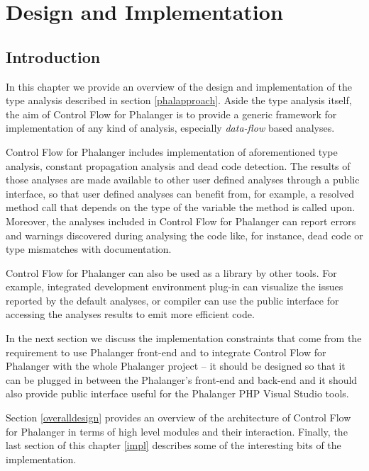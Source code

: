 \chapter{Design and Implementation}
\label{designandimpl}

    \section{Introduction}
    
    In this chapter we provide an overview of the design and 
    implementation of the type analysis described in 
    section \ref{phalapproach}. Aside the type analysis 
    itself, the aim of Control Flow for Phalanger is to provide 
    a generic framework for implementation of any kind 
    of analysis, especially \emph{data-flow} based analyses.
    
    Control Flow for Phalanger includes implementation of 
    aforementioned type analysis, constant propagation analysis 
    and dead code detection. The results of those analyses 
    are made available to other user defined analyses 
    through a public interface, so that user defined analyses 
    can benefit from, for example, a resolved method call 
    that depends on the type of the variable the method 
    is called upon. Moreover, the analyses included in 
    Control Flow for Phalanger can report errors and warnings 
    discovered during analysing the code like, for instance, 
    dead code or type mismatches with documentation.
    
    Control Flow for Phalanger can also be used as a 
    library by other tools. For example, integrated 
    development environment plug-in can visualize the 
    issues reported by the default analyses, or compiler 
    can use the public interface for accessing the 
    analyses results to emit more efficient code.
    
    In the next section we discuss the implementation 
    constraints that come from the requirement to use 
    Phalanger front-end and to integrate Control Flow 
    for Phalanger with the whole Phalanger project -- 
    it should be designed so that it can be plugged 
    in between the Phalanger's front-end and back-end 
    and it should also provide public interface useful 
    for the Phalanger PHP Visual Studio tools.
    
    Section \ref{overalldesign} provides an overview 
    of the architecture of Control Flow for Phalanger in 
    terms of high level modules and their interaction. 
    Finally, the last section of this chapter \ref{impl} describes 
    some of the interesting bits of the implementation.
    
